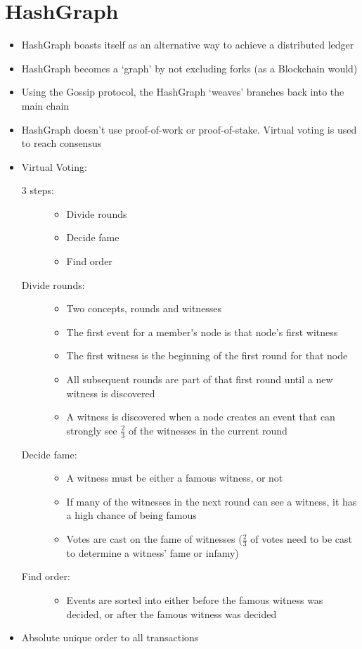 \section{HashGraph}
\begin{itemize}
	\item HashGraph boasts itself as an alternative way to achieve a distributed ledger
	\item HashGraph becomes a `graph' by not excluding forks (as a Blockchain would)
	\item Using the Gossip protocol, the HashGraph `weaves' branches back into the main chain
	\item HashGraph doesn't use proof-of-work or proof-of-stake. Virtual voting is used to reach consensus
	\item Virtual Voting:
	\begin{description}
		\item[3 steps:]
			\begin{itemize}
				\item Divide rounds
				\item Decide fame
				\item Find order
			\end{itemize}
		\item[Divide rounds:]
			\begin{itemize}
				\item Two concepts, rounds and witnesses
				\item The first event for a member's node is that node's first witness
				\item The first witness is the beginning of the first round for that node
				\item All subsequent rounds are part of that first round until a new witness is discovered
				\item A witness is discovered when a node creates an event that can strongly see $\frac{2}{3}$ of the witnesses in the current round
			\end{itemize}
		\item[Decide fame:]
			\begin{itemize}
				\item A witness must be either a famous witness, or not
				\item If many of the witnesses in the next round can see a witness, it has a high chance of being famous
				\item Votes are cast on the fame of witnesses ($\frac{2}{3}$ of votes need to be cast to determine a witness' fame or infamy)
			\end{itemize}
		\item[Find order:]
			\begin{itemize}
				\item Events are sorted into either before the famous witness was decided, or after the famous witness was decided
			\end{itemize}
	\end{description}
	\item Absolute unique order to all transactions
\end{itemize}